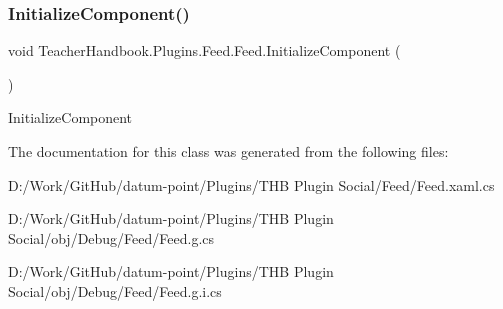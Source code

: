 \subsubsection{\texorpdfstring{Initialize\+Component()}{InitializeComponent()}\hspace{0.1cm}{\footnotesize\ttfamily [7/7]}}
{\footnotesize\ttfamily void Teacher\+Handbook.\+Plugins.\+Feed.\+Feed.\+Initialize\+Component (\begin{DoxyParamCaption}{ }\end{DoxyParamCaption})}



Initialize\+Component 



The documentation for this class was generated from the following files\+:\begin{DoxyCompactItemize}
\item 
D\+:/\+Work/\+Git\+Hub/datum-\/point/\+Plugins/\+T\+H\+B Plugin Social/\+Feed/Feed.\+xaml.\+cs\item 
D\+:/\+Work/\+Git\+Hub/datum-\/point/\+Plugins/\+T\+H\+B Plugin Social/obj/\+Debug/\+Feed/Feed.\+g.\+cs\item 
D\+:/\+Work/\+Git\+Hub/datum-\/point/\+Plugins/\+T\+H\+B Plugin Social/obj/\+Debug/\+Feed/Feed.\+g.\+i.\+cs\end{DoxyCompactItemize}
